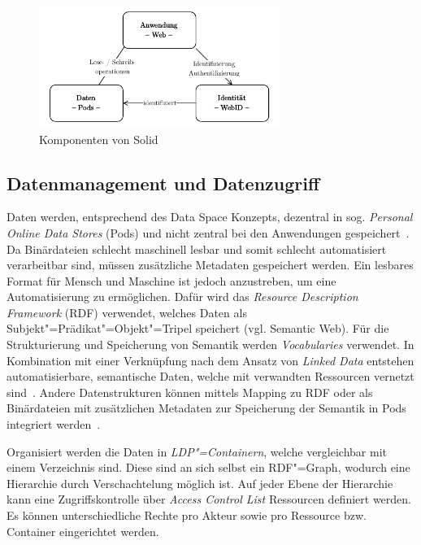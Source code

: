 \begin{figure}[b]
    \includegraphics[width=0.7\textwidth]{../shared/assets/solid_triangle.drawio.pdf}
    \caption{Komponenten von Solid}
    \label{fig:solid-components}
\end{figure}


\subsection{Datenmanagement und Datenzugriff}

Daten werden, entsprechend des Data Space Konzepts, dezentral in sog. \emph{Personal Online Data Stores} (Pods) und nicht zentral bei den Anwendungen gespeichert~\cite{mecklerWebLinkedData2023}.
Da Binärdateien schlecht maschinell lesbar und somit schlecht automatisiert verarbeitbar sind, müssen zusätzliche Metadaten gespeichert werden.
Ein lesbares Format für Mensch und Maschine ist jedoch anzustreben, um eine Automatisierung zu ermöglichen.
Dafür wird das \emph{Resource Description Framework} (RDF) verwendet, welches Daten als Subjekt"=Prädikat"=Objekt"=Tripel speichert (vgl. Semantic Web).
Für die Strukturierung und Speicherung von Semantik werden \emph{Vocabularies} verwendet.
In Kombination mit einer Verknüpfung nach dem Ansatz von \emph{Linked Data} entstehen automatisierbare, semantische Daten, welche mit verwandten Ressourcen vernetzt sind~\cite{bizerLinkedDataStory2009,mecklerWebLinkedData2023,sambraSolidPlatformDecentralized2016}.
Andere Datenstrukturen können mittels Mapping zu RDF oder als Binärdateien mit zusätzlichen Metadaten zur Speicherung der Semantik in Pods integriert werden~\cite{mecklerWebLinkedData2023,sambraSolidPlatformDecentralized2016}.

Organisiert werden die Daten in \emph{LDP"=Containern}, welche vergleichbar mit einem Verzeichnis sind.
Diese sind an sich selbst ein RDF"=Graph, wodurch eine Hierarchie durch Verschachtelung möglich ist.
Auf jeder Ebene der Hierarchie kann eine Zugriffskontrolle über \emph{Access Control List} Ressourcen definiert werden.
Es können unterschiedliche Rechte pro Akteur sowie pro Ressource bzw. Container eingerichtet werden.

